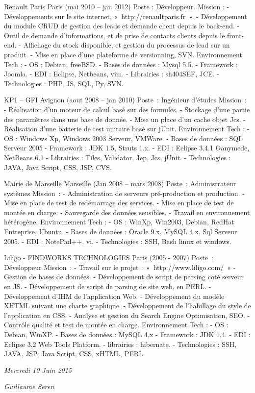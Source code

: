 \documentclass[print]{GuillaumeSeren-cv}
\begin{document}
\begin{entrylist}
  \entry
  {Renault Paris}
  {Paris (mai 2010 – jan 2012)}
  {Poste : Développeur.}
  {Mission :
- Développements sur le site internet, « http://renaultparis.fr ».
- Développement du module CRUD de gestion des leads et demande client depuis le back-end.
- Outil de demande d'informations, et de prise de contacts clients depuis le front-end.
- Affichage du stock disponible, et gestion du processus de lead sur un produit.
- Mise en place d'une plateforme de versionning, SVN.
Environnement Tech :
- OS : Debian, freeBSD.
- Bases de données : Mysql 5.5.
- Framework : Joomla.
- EDI : Eclipse, Netbeans, vim.
- Librairies : sh404SEF, JCE.
- Technologies : PHP, JS, SQL, Py, SVN.}

  \entry
  {KP1 – GFI}
  {Avignon (aout 2008 – jan 2010)}
  {Poste : Ingénieur d'études}
  {Mission :
- Réalisation d'un moteur de calcul basé sur des formules.
- Stockage d'une partie des paramètres dans une base de donnée.
- Mise un place d'un cache objet Jcs.
- Réalisation d'une batterie de test unitaire basé sur jUnit.
Environnement Tech :
- OS : Windows Xp, Windows 2003 Serveur, VMWare.
- Bases de données : SQL Serveur 2005
- Framework : JDK 1.5,  Struts 1.x.
- EDI : Eclipse 3.4.1 Ganymede, NetBeans 6.1
- Librairies : Tiles, Validator, Jep, Jcs, jUnit.
- Technologies : JAVA, Java Script, CSS, JSP, CVS.}

  \entry
  {Mairie de Marseille}
  {Marseille (Jan 2008 – mars 2008)}
  {Poste : Administrateur systèmes}
  {Mission :
- Administration de serveurs pré-production et production.
- Mise en place de test de redémarrage des services.
- Mise en place de test de montée en charge.
- Sauvegarde des données sensibles.
- Travail en environnement hétérogène.
Environnement Tech :
- OS : WinXp, Win2003, Debian, RedHat Entreprise, Ubuntu.
- Bases de données : Oracle 9.x, MySQL 4.x, Sql Serveur 2005.
- EDI : NotePad++, vi.
- Technologies : SSH, Bash linux et windows.}

  \entry
  {Liligo - FINDWORKS TECHNOLOGIES}
  {Paris (2005 - 2007)}
  {Poste : Développeur}
  {Mission :
- Travail sur le projet : « http://www.liligo.com/ »
- Gestion de bases de données.
- Développement de script de parsing coté serveur en JS.
- Développement de script de parsing de site web, en PERL.
- Développement d'IHM de l'application Web.
- Développement du modèle XHTML suivant une charte graphique.
- Développement de l’habillage du style de l'application en CSS.
- Analyse et gestion du Search Engine Optimisation, SEO.
- Contrôle qualité et test de montée en charge.
Environnement Tech :
- OS : Debian, WinXP.
- Bases de données : MySQL 4,x
- Framework : JDK 1,4.
- EDI : Eclipse 3,2 Web Tools Platform.
- librairies : hibernate.
- Technologies : SSH, JAVA, JSP, Java Script, CSS, xHTML, PERL.}
\end{entrylist}

\begin{flushleft}
\emph{Mercredi 10 Juin 2015}
\end{flushleft}

\begin{flushright}
\emph{Guillaume Seren}
\end{flushright}
\end{document}

